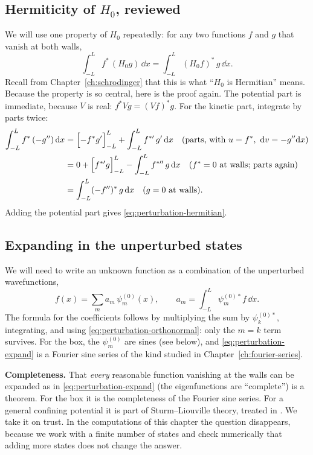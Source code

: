 \subsection{Hermiticity of $H_0$, reviewed}

We will use one property of $H_0$ repeatedly: for any two functions $f$ and $g$ that vanish at both walls,
\begin{equation}
\int_{-L}^{L}f^*\,(H_0 g)\,\dd x=\int_{-L}^{L}(H_0 f)^*\,g\,\dd x .
\label{eq:perturbation-hermitian}
\end{equation}
Recall from Chapter~\ref{ch:schrodinger} that this is what ``$H_0$ is Hermitian'' means. Because the property is so central, here is the proof again. The potential part is immediate, because $V$ is real: $f^*Vg=(Vf)^*g$. For the kinetic part, integrate by parts twice:
\begin{align*}
\int_{-L}^{L}f^*\,(-g'')\,\mathrm{d} x
&=\Bigl[-f^*g'\Bigr]_{-L}^{L}+\int_{-L}^{L}f^{*\prime}\,g'\,\mathrm{d} x
\quad\text{(parts, with } u=f^*,\ \mathrm{d} v=-g''\mathrm{d} x)\\
&=0+\Bigl[f^{*\prime}g\Bigr]_{-L}^{L}-\int_{-L}^{L}f^{*\prime\prime}\,g\,\mathrm{d} x
\quad\text{($f^*=0$ at walls; parts again)}\\
&=\int_{-L}^{L}(-f'')^*\,g\,\mathrm{d} x
\quad\text{($g=0$ at walls)}.
\end{align*}
Adding the potential part gives \cref{eq:perturbation-hermitian}.

\subsection{Expanding in the unperturbed states}

We will need to write an unknown function as a combination of the unperturbed wavefunctions,
\begin{equation}
f(x)=\sum_{m}a_m\,\psi_m^{(0)}(x),\qquad a_m=\int_{-L}^{L}\psi_m^{(0)*}f\,\dd x .
\label{eq:perturbation-expand}
\end{equation}
The formula for the coefficients follows by multiplying the sum by $\psi_k^{(0)*}$, integrating, and using \cref{eq:perturbation-orthonormal}: only the $m=k$ term survives. For the box, the $\psi_m^{(0)}$ are sines (see below), and \cref{eq:perturbation-expand} is a Fourier sine series of the kind studied in Chapter~\ref{ch:fourier-series}.

\begin{beyond}
\textbf{Completeness.} That \emph{every} reasonable function vanishing at the walls can be expanded as in \cref{eq:perturbation-expand} (the eigenfunctions are ``complete'') is a theorem. For the box it is the completeness of the Fourier sine series. For a general confining potential it is part of Sturm--Liouville theory, treated in \cite{rhb}. We take it on trust. In the computations of this chapter the question disappears, because we work with a finite number of states and check numerically that adding more states does not change the answer.
\end{beyond}

